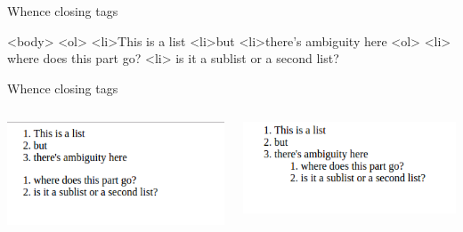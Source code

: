 \documentclass{beamer}
\begin{document}
\begin{frame}[fragile]{Whence closing tags}
  \begin{block}{}
    \begin{semiverbatim}
      <body>
        <ol>
          <li>This is a list\onslide<2,3>{</li>}
          <li>but
          <li>there's ambiguity here
        <ol>
         <li> where does this part go?
         <li> is it a sublist or a second list?\onslide<2,3>{</li>}
        \onslide<2,3>{</ol>}
    \end{semiverbatim}
  \end{block}
\end{frame}

\begin{frame}[fragile]{Whence closing tags}
  \begin{columns}
    \begin{column}{0.4\columnwidth}
      \begin{block}{}
        \includegraphics[width=.9\linewidth]{noClose1}
      \end{block}
    \end{column}
    \begin{column}{0.4\columnwidth}
      \begin{block}{}
        \includegraphics[width=.9\linewidth]{noClose2}
      \end{block}
    \end{column}
  \end{columns}
\end{frame}
\end{document}

